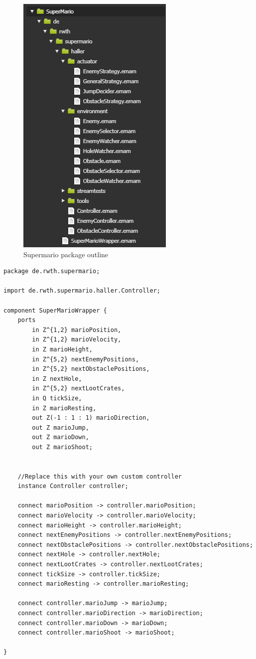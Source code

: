 \begin{figure}[!h]
	\centering
	\includegraphics[scale=1]{pictures/haller_mariooutline.PNG}
	\caption{Supermario package outline}
	\label{fig:mariopackageoutline}
\end{figure}


\begin{lstlisting}[caption=SuperMarioWrapper.emam, morekeywords={package, stream, tick, for, ports, port, connect, component, in, out, instance, ->},
frame=single, basicstyle=\tiny]
package de.rwth.supermario;

import de.rwth.supermario.haller.Controller;

component SuperMarioWrapper {
    ports   
        in Z^{1,2} marioPosition,
        in Z^{1,2} marioVelocity,
        in Z marioHeight,
        in Z^{5,2} nextEnemyPositions,
        in Z^{5,2} nextObstaclePositions,
        in Z nextHole,
        in Z^{5,2} nextLootCrates,
        in Q tickSize,
        in Z marioResting,
        out Z(-1 : 1 : 1) marioDirection,
        out Z marioJump,
        out Z marioDown,
        out Z marioShoot;
        

    //Replace this with your own custom controller
    instance Controller controller;
    
    connect marioPosition -> controller.marioPosition;
    connect marioVelocity -> controller.marioVelocity;
    connect marioHeight -> controller.marioHeight;
    connect nextEnemyPositions -> controller.nextEnemyPositions;
    connect nextObstaclePositions -> controller.nextObstaclePositions;
    connect nextHole -> controller.nextHole;
    connect nextLootCrates -> controller.nextLootCrates;
    connect tickSize -> controller.tickSize;
    connect marioResting -> controller.marioResting;
    
    connect controller.marioJump -> marioJump;
    connect controller.marioDirection -> marioDirection;
    connect controller.marioDown -> marioDown;
    connect controller.marioShoot -> marioShoot;
    
}
\end{lstlisting}


